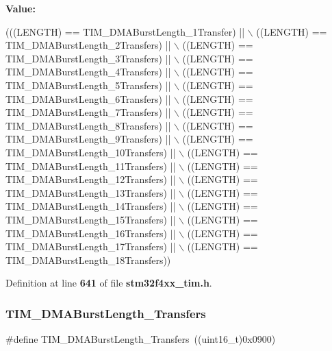 {\bfseries Value\+:}
\begin{DoxyCode}
(((LENGTH) == TIM_DMABurstLength_1Transfer) || \(\backslash\)
                                   ((LENGTH) == TIM_DMABurstLength_2Transfers) || \(\backslash\)
                                   ((LENGTH) == TIM_DMABurstLength_3Transfers) || \(\backslash\)
                                   ((LENGTH) == TIM_DMABurstLength_4Transfers) || \(\backslash\)
                                   ((LENGTH) == TIM_DMABurstLength_5Transfers) || \(\backslash\)
                                   ((LENGTH) == TIM_DMABurstLength_6Transfers) || \(\backslash\)
                                   ((LENGTH) == TIM_DMABurstLength_7Transfers) || \(\backslash\)
                                   ((LENGTH) == TIM_DMABurstLength_8Transfers) || \(\backslash\)
                                   ((LENGTH) == TIM_DMABurstLength_9Transfers) || \(\backslash\)
                                   ((LENGTH) == TIM_DMABurstLength_10Transfers) || \(\backslash\)
                                   ((LENGTH) == TIM_DMABurstLength_11Transfers) || \(\backslash\)
                                   ((LENGTH) == TIM_DMABurstLength_12Transfers) || \(\backslash\)
                                   ((LENGTH) == TIM_DMABurstLength_13Transfers) || \(\backslash\)
                                   ((LENGTH) == TIM_DMABurstLength_14Transfers) || \(\backslash\)
                                   ((LENGTH) == TIM_DMABurstLength_15Transfers) || \(\backslash\)
                                   ((LENGTH) == TIM_DMABurstLength_16Transfers) || \(\backslash\)
                                   ((LENGTH) == TIM_DMABurstLength_17Transfers) || \(\backslash\)
                                   ((LENGTH) == TIM_DMABurstLength_18Transfers))
\end{DoxyCode}


Definition at line \textbf{ 641} of file \textbf{ stm32f4xx\+\_\+tim.\+h}.

\mbox{\label{group__TIM__DMA__Burst__Length_ga2fc09f2148cf6ebddc8e67116212259c}} 
\subsubsection{T\+I\+M\+\_\+\+D\+M\+A\+Burst\+Length\+\_\+Transfers}
{\footnotesize\ttfamily \#define T\+I\+M\+\_\+\+D\+M\+A\+Burst\+Length\+\_\+Transfers~((uint16\+\_\+t)0x0900)}



